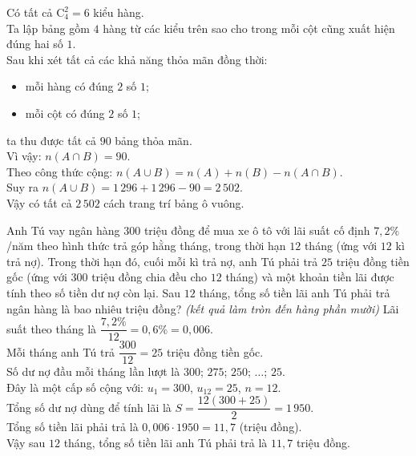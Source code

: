 \begin{ex}
{	Có tất cả $\mathrm{C}_4^2=6$ kiểu hàng.\\
	Ta lập bảng gồm $4$ hàng từ các kiểu trên sao cho trong mỗi cột cũng xuất hiện đúng hai số $1$.\\
	Sau khi xét tất cả các khả năng thỏa mãn đồng thời:
	\begin{itemize}
	\item mỗi hàng có đúng $2$ số $1$;
	\item mỗi cột có đúng $2$ số $1$;
	\end{itemize}
	ta thu được tất cả $90$ bảng thỏa mãn.\\
	Vì vậy: $ n(A\cap B)=90$.\\
	Theo công thức cộng: $n(A\cup B) =n(A)+n(B)-n(A\cap B)$.\\
	Suy ra $n(A\cup B) =1\, 296+1\,296-90=2\,502$.\\
	Vậy có tất cả $ 2\,502$ cách trang trí bảng ô vuông.
	}
\end{ex}

\begin{ex}%
	Anh Tú vay ngân hàng $300$ triệu đồng để mua xe ô tô với lãi suất cố định $7{,}2\%$/năm theo hình thức trả góp hằng tháng, trong thời hạn $12$ tháng (ứng với $12$ kì trả nợ). Trong thời hạn đó, cuối mỗi kì trả nợ, anh Tú phải trả $25$ triệu đồng tiền gốc (ứng với $300$ triệu đồng chia đều cho $12$ tháng) và một khoản tiền lãi được tính theo số tiền dư nợ còn lại. Sau $12$ tháng, tổng số tiền lãi anh Tú phải trả ngân hàng là bao nhiêu triệu đồng? \textit{(kết quả làm tròn đến hàng phần mười)}
	\loigiai
	{
	Lãi suất theo tháng là $\dfrac{7{,}2\%}{12}=0{,}6\%=0{,}006$.\\
	Mỗi tháng anh Tú trả $\dfrac{300}{12}=25$ triệu đồng tiền gốc.\\
	Số dư nợ đầu mỗi tháng lần lượt là $300$; $275$; $250$; $\ldots$; $25$.\\
	Đây là một cấp số cộng với: $u_1=300$, $u_{12}=25$, $n=12$.\\
	Tổng số dư nợ dùng để tính lãi là $S=\dfrac{12(300+25)}{2}=1\,950$.\\
	Tổng số tiền lãi phải trả là $0{,}006\cdot 1950=11{,}7$ (triệu đồng).\\
	Vậy sau $12$ tháng, tổng số tiền lãi anh Tú phải trả là $11{,}7$ triệu đồng.
	}
\end{ex}

